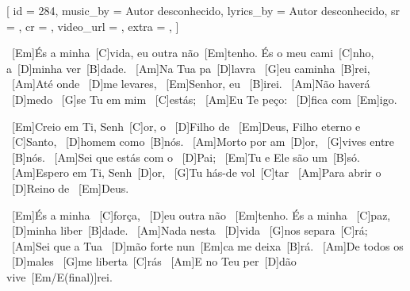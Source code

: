 [
    id          = {284},
    music_by    = {Autor desconhecido},
    lyrics_by   = {Autor desconhecido},
    sr          = {},
    cr          = {},
    video_url   = {},
    extra       = {},
]

\beginverse
\ [Em]És a minha\ [C]vida, eu outra não\ [Em]tenho. 
És o meu cami\ [C]nho, a\ [D]minha ver\ [B]dade.
\ [Am]Na Tua pa\ [D]lavra \ [G]eu caminha\ [B]rei,
\ [Am]Até onde \ [D]me levares, \ [Em]Senhor, eu \ [B]irei.
\ [Am]Não haverá \ [D]medo \ [G]se Tu em mim \ [C]estás; 
\ [Am]Eu Te peço: \ [D]fica com\ [Em]igo. 
\endverse

\beginverse
\ [Em]Creio em Ti, Senh\ [C]or, o \ [D]Filho de \ [Em]Deus, 
Filho eterno e \ [C]Santo, \ [D]homem como\ [B]nós. 
\ [Am]Morto por am\ [D]or, \ [G]vives entre \ [B]nós. 
\ [Am]Sei que estás com o \ [D]Pai; \ [Em]Tu e Ele são um\ [B]só. 
\ [Am]Espero em Ti, Senh\ [D]or, \ [G]Tu hás-de vol\ [C]tar 
\ [Am]Para abrir o \ [D]Reino de \ [Em]Deus. 
\endverse

\beginverse
\ [Em]És a minha \ [C]força, \ [D]eu outra não \ [Em]tenho. 
És a minha \ [C]paz, \ [D]minha liber\ [B]dade. 
\ [Am]Nada nesta \ [D]vida \ [G]nos separa\ [C]rá; 
\ [Am]Sei que a Tua \ [D]mão forte nun\ [Em]ca me deixa\ [B]rá. 
\ [Am]De todos os \ [D]males \ [G]me liberta\ [C]rás 
\ [Am]E no Teu per\ [D]dão vive\ [Em/E(final)]rei.
\endverse

\endsong
